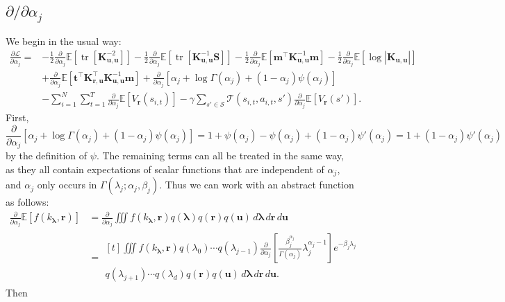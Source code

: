\documentclass{article}
\theoremstyle{definition}
\DeclareMathOperator{\tr}{tr}
\newcommand{\Kuu}{\mathbf{K}_{\mathbf{u},\mathbf{u}}}
\newcommand{\Kru}{\mathbf{K}_{\mathbf{r},\mathbf{u}}}
\newcommand{\da}{\frac{\partial}{\partial\alpha_j}}
\begin{document}
\subsection{$\partial/\partial\alpha_j$}

We begin in the usual way:
\[
  \begin{split}
    \frac{\partial\mathcal{L}}{\partial\alpha_j} = &-
    \frac{1}{2}\da\mathbb{E}[\tr[\Kuu^{-2}]] - \frac{1}{2}\da\mathbb{E}[\tr[\Kuu^{-1}\mathbf{S}]] - \frac{1}{2}\da\mathbb{E}[\mathbf{m}^\intercal\Kuu^{-1}\mathbf{m}] - \frac{1}{2}\da\mathbb{E}[\log|\Kuu|] \\
    &+ \da\mathbb{E}[\mathbf{t}^\intercal\Kru^\intercal\Kuu^{-1}\mathbf{m}] +
    \da [\alpha_j + \log\Gamma(\alpha_j) + (1 - \alpha_j)\psi(\alpha_j)] \\
      &- \sum_{i=1}^N \sum_{t=1}^T \da\mathbb{E}[V_{\mathbf{r}}(s_{i,t})] -
        \gamma\sum_{s' \in \mathcal{S}} \mathcal{T}(s_{i,t}, a_{i,t},
        s')\da\mathbb{E}[V_{\mathbf{r}}(s')].
  \end{split}
\]
First,
\[ \da [\alpha_j + \log\Gamma(\alpha_j) + (1 - \alpha_j)\psi(\alpha_j)] = 1 +
  \psi(\alpha_j) - \psi(\alpha_j) + (1 - \alpha_j)\psi'(\alpha_j) = 1 + (1 -
  \alpha_j)\psi'(\alpha_j) \]
by the definition of $\psi$. The remaining terms can all be treated in the same
way, as they all contain expectations of scalar functions that are independent
of $\alpha_j$, and $\alpha_j$ only occurs in $\Gamma(\lambda_j; \alpha_j,
\beta_j)$. Thus we can work with an abstract function as follows:
\[
  \begin{split}
    \da\mathbb{E}[f(k_{\bm\lambda}, \mathbf{r})] &= \da \iiint f(k_{\bm\lambda},
    \mathbf{r}) q(\bm\lambda) q(\mathbf{r})
    q(\mathbf{u})\,d\bm\lambda\,d\mathbf{r}\,d\mathbf{u} \\
    &= \begin{multlined}[t]
      \iiint f(k_{\bm\lambda}, \mathbf{r}) q(\lambda_0) \cdots q(\lambda_{j-1}) \da
      \left[ \frac{\beta_j^{\alpha_j}}{\Gamma(\alpha_j)} \lambda_j^{\alpha_j -
          1} \right] e^{-\beta_j\lambda_j} \\
      q(\lambda_{j+1}) \cdots q(\lambda_d) q(\mathbf{r})
      q(\mathbf{u})\,d\bm\lambda\,d\mathbf{r}\,d\mathbf{u}.
    \end{multlined}
  \end{split}
\]
Then
\end{document}

